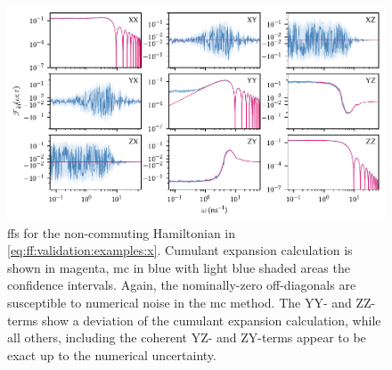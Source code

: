 \begin{figure}
    \centering
    \includegraphics{img/pdf/filter_functions/monte_carlo_FF_X}
    \caption[]{
        \Glspl{ff} for the non-commuting Hamiltonian in \cref{eq:ff:validation:examples:x}.
        Cumulant expansion calculation is shown in magenta, \gls{mc} in blue with light blue shaded areas the confidence intervals.
        Again, the nominally-zero off-diagonals are susceptible to numerical noise in the \gls{mc} method.
        The YY- and ZZ-terms show a deviation of the cumulant expansion calculation, while all others, including the coherent YZ- and ZY-terms appear to be exact up to the numerical uncertainty.
    }
    \label{fig:ff:monte_carlo:X}
\end{figure}

